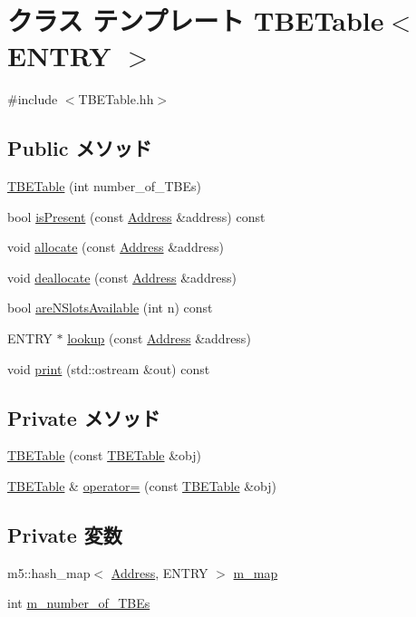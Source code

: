 \hypertarget{classTBETable}{
\section{クラス テンプレート TBETable$<$ ENTRY $>$}
\label{classTBETable}
}


{\ttfamily \#include $<$TBETable.hh$>$}\subsection*{Public メソッド}
\begin{DoxyCompactItemize}
\item 
\hyperlink{classTBETable_ac5f2ff856f2cb9f8a695ef3daa7fa9eb}{TBETable} (int number\_\-of\_\-TBEs)
\item 
bool \hyperlink{classTBETable_afd5a917773820c248524ea40d6931646}{isPresent} (const \hyperlink{classAddress}{Address} \&address) const 
\item 
void \hyperlink{classTBETable_a5b0f65e7d424629299a1ade3553e5bc1}{allocate} (const \hyperlink{classAddress}{Address} \&address)
\item 
void \hyperlink{classTBETable_ad1a3e4943cc214363839148c7d94d6a4}{deallocate} (const \hyperlink{classAddress}{Address} \&address)
\item 
bool \hyperlink{classTBETable_ae13afb1718bd58354c590c13e8e7f42f}{areNSlotsAvailable} (int n) const 
\item 
ENTRY $\ast$ \hyperlink{classTBETable_a44b3e7d7c435b9326d2de61d2d65af2e}{lookup} (const \hyperlink{classAddress}{Address} \&address)
\item 
void \hyperlink{classTBETable_ac55fe386a101fbae38c716067c9966a0}{print} (std::ostream \&out) const 
\end{DoxyCompactItemize}
\subsection*{Private メソッド}
\begin{DoxyCompactItemize}
\item 
\hyperlink{classTBETable_a431b9127dc77b1431db45225a81e84af}{TBETable} (const \hyperlink{classTBETable}{TBETable} \&obj)
\item 
\hyperlink{classTBETable}{TBETable} \& \hyperlink{classTBETable_a6dac37cd05bf0d7230bf69307dee9abf}{operator=} (const \hyperlink{classTBETable}{TBETable} \&obj)
\end{DoxyCompactItemize}
\subsection*{Private 変数}
\begin{DoxyCompactItemize}
\item 
m5::hash\_\-map$<$ \hyperlink{classAddress}{Address}, ENTRY $>$ \hyperlink{classTBETable_a417c02484273117796b838cfc46fa2db}{m\_\-map}
\item 
int \hyperlink{classTBETable_a9fe046cc3878d0da925915f0f90ab8c2}{m\_\-number\_\-of\_\-TBEs}
\end{DoxyCompactItemize}
